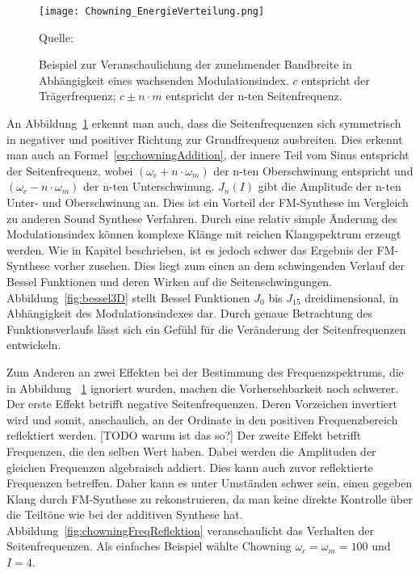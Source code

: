 \begin{figure} [ht]
\centering
  \texttt{[image: Chowning\_EnergieVerteilung.png]}
\caption{Beispiel zur Veranschaulichung der zunehmender Bandbreite in Abhängigkeit eines wachsenden Modulationsindex. $c$ entspricht der Trägerfrequenz; $c\pm n\cdot m$ entspricht der n-ten Seitenfrequenz.}
\label{fig:chowningEnergieVerteilung}
Quelle: \cite{chowningPaper}
\end{figure}
\FloatBarrier

An Abbildung~\ref{fig:chowningEnergieVerteilung} erkennt man auch, dass die Seitenfrequenzen sich symmetrisch in negativer und positiver Richtung zur Grundfrequenz ausbreiten. Dies erkennt man auch an Formel~\ref{eq:chowningAddition}, der innere Teil vom Sinus entspricht der Seitenfrequenz, wobei $(\omega_c+n\cdot \omega_m)$ der n-ten Oberschwinung entspricht und $(\omega_c-n\cdot \omega_m)$ der n-ten Unterschwinung. $J_n(I)$ gibt die Amplitude der n-ten Unter- und Oberschwinung an. 
Dies ist ein Vorteil der FM-Synthese im Vergleich zu anderen Sound Synthese Verfahren. Durch eine relativ simple Änderung des Modulationsindex können komplexe Klänge mit reichen Klangspektrum erzeugt werden.
Wie in Kapitel  beschrieben, ist es jedoch schwer das Ergebnis der FM-Synthese vorher zusehen. Dies liegt zum einen an dem schwingenden Verlauf der Bessel Funktionen und deren Wirken auf die Seitenschwingungen. Abbildung~\ref{fig:bessel3D} stellt Bessel Funktionen $J_0$ bis $J_{15}$ dreidimensional, in Abhängigkeit des Modulationsindexes dar.
Durch genaue Betrachtung des Funktionsverlaufs lässt sich ein Gefühl für die Veränderung der Seitenfrequenzen entwickeln.

Zum Anderen an zwei Effekten bei der Bestimmung des Frequenzspektrums, die in Abbildung~ \ref{fig:chowningEnergieVerteilung} ignoriert wurden, machen die Vorhersehbarkeit noch schwerer. Der erste Effekt betrifft negative Seitenfrequenzen. Deren Vorzeichen invertiert wird und somit, anschaulich, an der Ordinate in den positiven Frequenzbereich reflektiert werden. [TODO warum ist das so?] Der zweite Effekt betrifft Frequenzen, die den selben Wert haben. Dabei werden die Amplituden der gleichen Frequenzen algebraisch addiert. Dies kann auch zuvor reflektierte Frequenzen betreffen. Daher kann es unter Umständen schwer sein, einen gegeben Klang durch FM-Synthese zu rekonstruieren, da man keine direkte Kontrolle über die Teiltöne wie bei der additiven Synthese hat. Abbildung~\ref{fig:chowningFreqReflektion} veranschaulicht das Verhalten der Seitenfrequenzen. Als einfaches Beispiel wählte Chowning $\omega_c=\omega_m=100$ und $I=4$.


